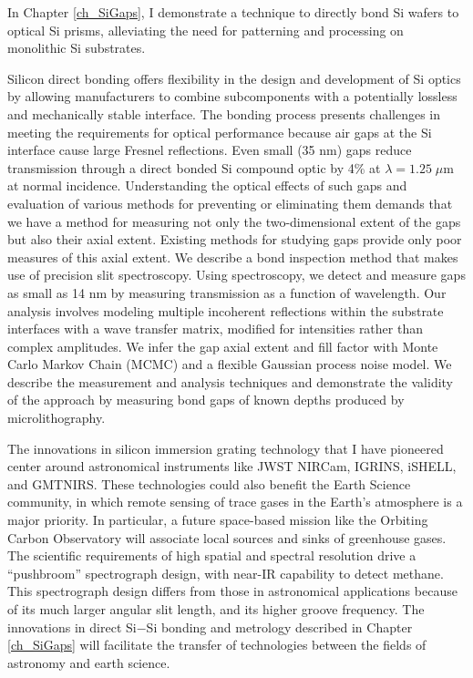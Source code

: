 In Chapter \ref{ch_SiGaps}, I demonstrate a technique to directly bond Si wafers to optical Si prisms, alleviating the need for patterning and processing on monolithic Si substrates.

Silicon direct bonding offers flexibility in the design and development of Si optics by allowing manufacturers to combine subcomponents with a potentially lossless and mechanically stable interface. The bonding process presents challenges in meeting the requirements for optical performance because air gaps at the Si interface cause large Fresnel reflections. Even small (35 nm) gaps reduce transmission through a direct bonded Si compound optic by 4\% at $\lambda = 1.25 \; \mu$m at normal incidence. Understanding the optical effects of such gaps and evaluation of various methods for preventing or eliminating them demands that we have a method for measuring not only the two-dimensional extent of the gaps but also their axial extent.  Existing methods for studying gaps provide only poor measures of this axial extent.  We describe a bond inspection method that makes use of precision slit spectroscopy.  Using spectroscopy, we detect and measure gaps as small as 14 nm by measuring transmission as a function of wavelength. Our analysis involves modeling multiple incoherent reflections within the substrate interfaces with a wave transfer matrix, modified for intensities rather than complex amplitudes. We infer the gap axial extent and fill factor with Monte Carlo Markov Chain (MCMC) and a flexible Gaussian process noise model.  We describe the measurement and analysis techniques and demonstrate the validity of the approach by measuring bond gaps of known depths produced by microlithography.


The innovations in silicon immersion grating technology that I have pioneered center around astronomical instruments like JWST NIRCam, IGRINS, iSHELL, and GMTNIRS.  These technologies could also benefit the Earth Science community, in which remote sensing of trace gases in the Earth's atmosphere is a major priority.  In particular, a future space-based mission like the Orbiting Carbon Observatory will associate local sources and sinks of greenhouse gases.  The scientific requirements of high spatial and spectral resolution drive a ``pushbroom'' spectrograph design, with near-IR capability to detect methane.  This spectrograph design differs from those in astronomical applications because of its much larger angular slit length, and its higher groove frequency.  The innovations in direct Si$-$Si bonding and metrology described in Chapter \ref{ch_SiGaps} will facilitate the transfer of technologies between the fields of astronomy and earth science.  

